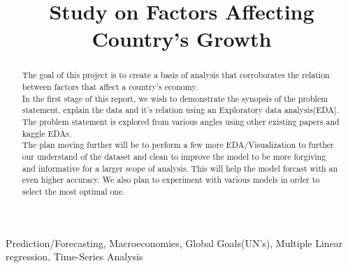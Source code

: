 \documentclass[conference]{IEEEtran}
\begin{document}
\title{Study on Factors Affecting Country's Growth}

\author{
    \and
    \and

}

\maketitle
\begin{abstract}
    The goal of this project is to create a basis of analysis that corroborates the relation between factors that affect a country's economy.\\
    In the first stage of this report, we wish to demonstrate the synopsis of the problem statement, explain the data and it's relation using an Exploratory data analysis(EDA]. The problem statement is explored from various angles using other existing papers and kaggle EDAs.\\
    The plan moving further will be to perform a few more EDA/Visualization to further our understand of the dataset and clean to improve the model to be more forgiving and informative for a larger scope of analysis. This will help the model forcast with an even higher accuracy. We also plan to experiment with various models in order to select the most optimal one.
\end{abstract}
\bigskip
\begin{IEEEkeywords}
    Prediction/Forecasting, Macroeconomies, Global Goals(UN's), Multiple Linear regression, Time-Series Analysis
\end{IEEEkeywords}
\end{document}
